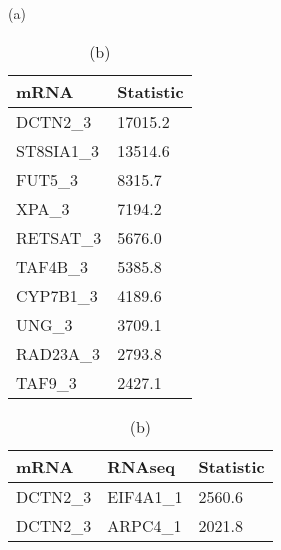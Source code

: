 \begin{table}[t!]

\begin{minipage}{.5\linewidth}
\caption*{(a)}
\centering
\begin{tabular}{ll}
\hline mRNA & Statistic \\\hline
DCTN2\_3   & 17015.2   \\ 
ST8SIA1\_3 & 13514.6   \\ 
FUT5\_3    &  8315.7   \\ 
XPA\_3     &  7194.2   \\ 
RETSAT\_3  &  5676.0   \\ 
TAF4B\_3   &  5385.8   \\ 
CYP7B1\_3  &  4189.6   \\ 
UNG\_3     &  3709.1   \\ 
RAD23A\_3  &  2793.8   \\ 
TAF9\_3    &  2427.1   \\ 
\hline
\end{tabular}
\end{minipage}
\begin{minipage}{.5\linewidth}
\caption*{(b)}
\centering
\begin{tabular}{lll}
\hline
mRNA & RNAseq & Statistic \\\hline
DCTN2\_3   & EIF4A1\_1  & 2560.6    \\ 
DCTN2\_3   & ARPC4\_1   & 2021.8    \\ 

\end{tabular}
\end{minipage}
\end{table}
